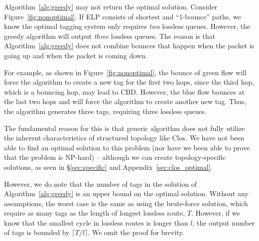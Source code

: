  Algorithm~\ref{alg:greedy} may not return the optimal
solution.  Consider Figure~\ref{fig:nonoptimal}.  If ELP
consists of shortest and ``1-bounce'' paths, we know the optimal tagging system
only requires {\em two} lossless queues. However, the greedy algorithm will
output {\em three} lossless queues. The reason is that
Algorithm~\ref{alg:greedy} does not combine bounces that happen when the packet
is going up and when the packet is coming down.

For example, as shown in Figure~\ref{fig:nonoptimal}, the bounce of green flow
will force the algorithm to create a new tag for the first two hops,
since the third hop, which is a bouncing hop, may lead to CBD.  However, the
blue flow bounces at the last two hops and will force the algorithm to create
another new tag. Thus, the algorithm generates three tags, requiring
three lossless queues.

The fundamental reason for this is that generic algorithm does not fully utilize
the inherent characteristics of structured topology like Clos. We have not been
able to find an optimal solution to this problem (nor have we been able to prove
that the problem is NP-hard) -- although we can create topology-specific
solutions, as seen in \S\ref{sec:specific} and Appendix~\ref{sec:clos_optimal}. 

However, we do note that the number of tags in the solution of
Algorithm~\ref{alg:greedy} is an upper bound on the optimal solution.  Without
any assumptions, the worst case is the same as using the brute-force solution,
which require as many tags as the length of longest lossless route, $T$.
However, if we know that the smallest cycle in lossless routes is longer than
$l$, the output number of tags is bounded by $\lceil T/l \rceil$. We omit the
proof for brevity.

